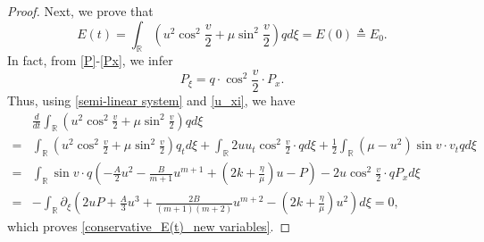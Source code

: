 \documentclass[10pt]{article}
\numberwithin{equation}{section}
\begin{document}
\begin{proof}
		Next, we prove that
		\begin{equation}\label{conservative_E(t)_new variables}
			E(t)=\int_{\mathbb{R}}\left(u^2\cos^2\frac{v}{2}+\mu\sin^2\frac{v}{2}\right)qd\xi=E(0)\triangleq E_0.
		\end{equation}
		In fact, from \eqref{P}-\eqref{Px}, we infer
		$$P_\xi=q\cdot\cos^2\frac{v}{2}\cdot P_x.$$
		Thus, using \eqref{semi-linear system} and \eqref{u_xi}, we have
		\begin{align*}
			&\frac{d}{dt}\int_{\mathbb{R}}\left(u^2\cos^2\frac{v}{2}+\mu\sin^2\frac{v}{2}\right)qd\xi\\
			=&\int_{\mathbb{R}}\left(u^2\cos^2\frac{v}{2}+\mu\sin^2\frac{v}{2}\right)q_td\xi+\int_{\mathbb{R}}2uu_t\cos^2\frac{v}{2}\cdot qd\xi+\frac{1}{2}\int_{\mathbb{R}}(\mu-u^2)\sin v\cdot v_tqd\xi\\
			=&\int_{\mathbb{R}}\sin v\cdot q\left(-\frac{A}{2}u^2-\frac{B}{m+1}u^{m+1}+\left(2k+\frac{\eta}{\mu}\right)u-P\right)-2u\cos^2\frac{v}{2}\cdot qP_xd\xi\\
			=&-\int_{\mathbb{R}}\partial_{\xi}\left(2uP+\frac{A}{3}u^3+\frac{2B}{(m+1)(m+2)}u^{m+2}-\left(2k+\frac{\eta}{\mu}\right)u^2\right)d\xi=0,
		\end{align*}
		which proves \eqref{conservative_E(t)_new variables}.
		

\end{proof}
\end{document}
